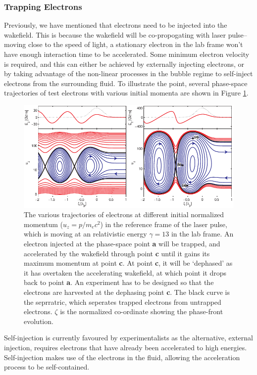 \documentclass[12pt,letter]{article}
\begin{document}
    \subsubsection{Trapping Electrons}
    Previously, we have mentioned that electrons need
    to be injected into the wakefield. This is because the wakefield will be
    co-propogating with laser pulse-- moving close to the speed of light, a
    stationary electron in the lab frame won't have enough interaction time to
    be accelerated. Some minimum electron velocity is required, and this can
    either be achieved by externally injecting electrons, or by taking
    advantage of the non-linear processes in the bubble regime to self-inject
    electrons from the surrounding fluid. To illustrate the point, several phase-space trajectories of test electrons
    with various initial momenta are shown in Figure
    \ref{fig:trapping}. 
\begin{figure}[h!]%
    \includegraphics[width=\textwidth]{../figures/trapping.pdf}
    \caption{\label{fig:trapping} The various trajectories of electrons at
    different initial normalized momentum ($u_z= p/m_e c^2$) in the reference frame of the laser
pulse, which is moving at an relativistic energy $\gamma = 13$ in the lab frame.
An electron injected at the phase-space point \textbf{a} will be trapped, and
accelerated by the wakefield through point \textbf{c} until it gains its maximum
momentum at point \textbf{c}. At point \textbf{c}, it will be `dephased' as it has overtaken
the accelerating wakefield, at which point it drops back to point \textbf{a}. An
experiment has to be designed so that the electrons are harvested at the
dephasing point \textbf{c}. The black curve is the seprratric, which seperates
trapped electrons from untrapped electrons. $\zeta$ is the normalized
co-ordinate showing the phase-front evolution.}

\end{figure}
    Self-injection is currently favoured by experimentalists as the alternative,
    external injection, requires electrons that have already been accelerated to
    high energies. Self-injection makes use of the electrons in the fluid,
    allowing the acceleration process to be self-contained.
    
\end{document}
